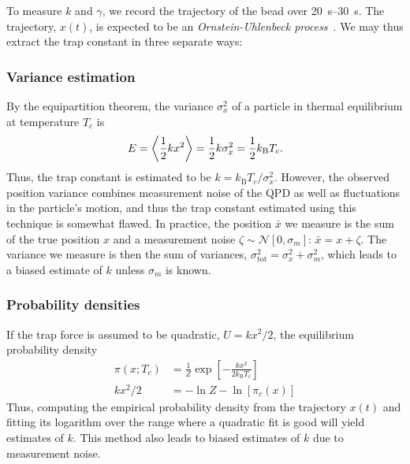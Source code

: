 \documentclass[hyperref={colorlinks=true, urlcolor=blue, citecolor=blue, final, bound}]{sfuthesis}
\newcommand{\kB}{k_{\mathrm{B}}}
\begin{document}
To measure $k$ and $\gamma$, we record the trajectory of the bead over \qtyrange{20}{30}{\second}. The trajectory, $x(t)$, is expected to be an \textit{Ornstein-Uhlenbeck process}~\cite{Risken1996}. We may thus extract the trap constant in three separate ways:

\subsubsection{Variance estimation}
By the equipartition theorem, the variance $\sigma_x^2$ of a particle in thermal equilibrium at temperature $T_c$ is
\begin{equation}
    E = \ev{\frac 12 kx^2} = \frac 12 k\sigma_x^2 = \frac 12 \kB T_c.\label{eq:equipartition}
\end{equation}
Thus, the trap constant is estimated to be $k = \kB T_c/\sigma_x^2$. However, the observed position variance combines measurement noise of the QPD as well as fluctuations in the particle's motion, and thus the trap constant estimated using this technique is somewhat flawed. In practice, the position $\bar x$ we measure is the sum of the true position $x$ and a measurement noise $\zeta\sim\mathcal N[0,\sigma_m]$: $\bar x=x+\zeta$. The variance we measure is then the sum of variances, $\sigma_{\mathrm{tot}}^2 = \sigma_x^2+\sigma_m^2$, which leads to a biased estimate of $k$ unless $\sigma_m$ is known.

\subsubsection{Probability densities}
If the trap force is assumed to be quadratic, $U=kx^2/2$, the equilibrium probability density 
\begin{align}
    \pi(x; T_c) &= \frac 1Z\exp[-\frac{kx^2}{2\kB T_c}]\\ \label{eq:harmonicEquilibrium}
    kx^2/2
    &= -\ln{Z}-\ln[\pi_c(x)]
\end{align}
Thus, computing the empirical probability density from the trajectory $x(t)$ and fitting its logarithm over the range where a quadratic fit is good will yield estimates of $k$. This method also leads to biased estimates of $k$ due to measurement noise.
\end{document}

